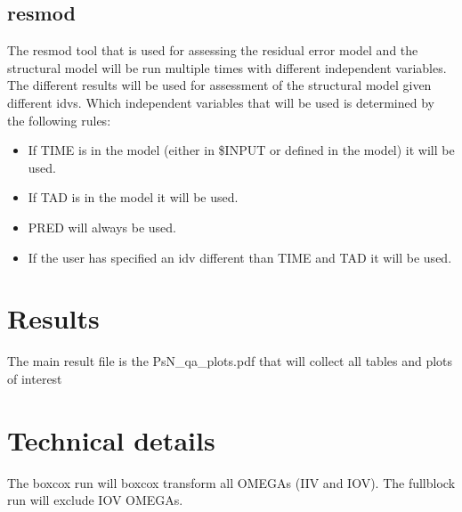 \subsection{resmod}
The resmod tool that is used for assessing the residual error model and the structural model will be run multiple times with different independent variables. The different results will be used for assessment of the structural model given different idvs. Which independent variables that will be used is determined by the following rules:
\begin{itemize}
    \item If TIME is in the model (either in \$INPUT or defined in the model) it will be used.
    \item If TAD is in the model it will be used.
    \item PRED will always be used.
    \item If the user has specified an idv different than TIME and TAD it will be used.
\end{itemize}


\section{Results}
The main result file is the PsN\_qa\_plots.pdf that will collect all tables and plots of interest

\section{Technical details}
The boxcox run will boxcox transform all OMEGAs (IIV and IOV). The fullblock run will exclude IOV OMEGAs.



